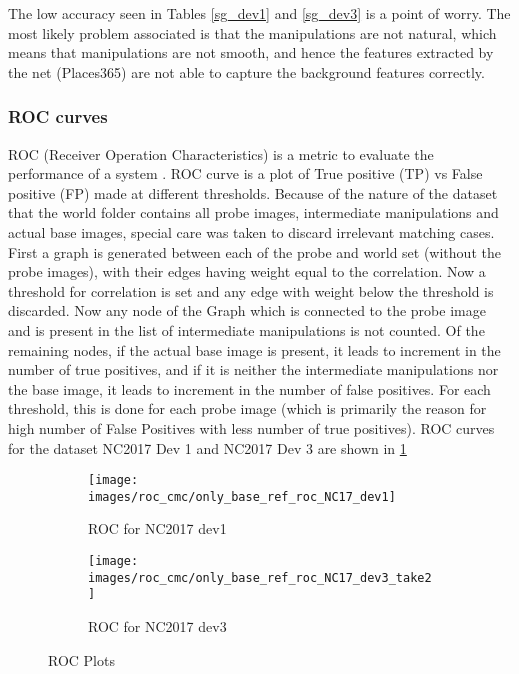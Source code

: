 \documentclass{article}
\begin{document}
The low accuracy seen in Tables \ref{sg_dev1} and \ref{sg_dev3} is a point of worry. The most likely problem associated is that the manipulations are not natural, which means that manipulations are not smooth, and hence the features extracted by the net (Places365) are not able to capture the background features correctly.

\subsubsection{ROC curves}
ROC (Receiver Operation Characteristics) is a metric to evaluate the performance of a system \cite{RC_lec}.
ROC curve is a plot of True positive (TP) vs False positive (FP) made at different thresholds. Because of the nature of the dataset that the world folder contains all probe images, intermediate manipulations and actual base images, special care was taken to discard irrelevant matching cases. First a graph is generated between each of the probe and world set (without the probe images), with their edges having weight equal to the correlation. Now a threshold for correlation is set and any edge with weight below the threshold is discarded. Now any node of the Graph which is connected to the probe image and is present in the list of intermediate manipulations is not counted. Of the remaining nodes, if the actual base image is present, it leads to increment in the number of true positives, and if it is neither the intermediate manipulations nor the base image, it leads to increment in the number of false positives. For each threshold, this is done for each probe image (which is primarily the reason for high number of False Positives with less number of true positives). ROC curves for the dataset NC2017 Dev 1 and NC2017 Dev 3 are shown in \ref{fig:roc1}

\begin{figure}[H]
  \centering
  \begin{subfigure}[H]{1.0\linewidth}
    \centering
    \texttt{[image: images/roc\_cmc/only\_base\_ref\_roc\_NC17\_dev1]}
    \caption{ROC for NC2017 dev1}
  \end{subfigure}
  \begin{subfigure}[H]{1.0\linewidth}
    \centering
    \texttt{[image: images/roc\_cmc/only\_base\_ref\_roc\_NC17\_dev3\_take2]}
    \caption{ROC for NC2017 dev3}
  \end{subfigure}
  \caption{ROC Plots}
  \label{fig:roc1}
\end{figure}
\end{document}
